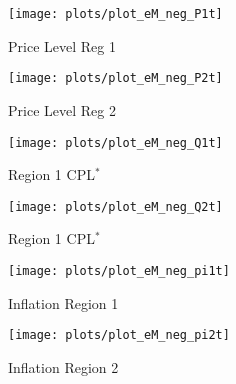 \documentclass[../thesis.tex]{subfiles}
\begin{document}
\begin{figure}[h!]
	\begin{subfigure}[b]{0.27\textwidth}
		\centering
		\texttt{[image: plots/plot\_eM\_neg\_P1t]}
		\caption{\scriptsize Price Level Reg 1}
		\label{fig:eM-neg-P1t}
	\end{subfigure}
	\hspace*{0.5cm}
	\begin{subfigure}[b]{0.27\textwidth}
		\centering
		\texttt{[image: plots/plot\_eM\_neg\_P2t]}
		\caption{\scriptsize Price Level Reg 2}
		\label{fig:eM-neg-P2t}
	\end{subfigure}
	\hspace*{0.5cm}
	\begin{subfigure}[b]{0.27\textwidth}
		\centering
		\texttt{[image: plots/plot\_eM\_neg\_Q1t]}
		\caption{\scriptsize Region 1 CPL$^{\ast}$}
		\label{fig:eM-neg-Q1t}
	\end{subfigure}
	\vspace*{0.1cm}
	\begin{subfigure}[b]{0.27\textwidth}
		\centering
		\texttt{[image: plots/plot\_eM\_neg\_Q2t]}
		\caption{\scriptsize Region 1 CPL$^{\ast}$}
		\label{fig:eM-neg-Q2t}
	\end{subfigure}
	\hspace*{0.5cm}
	\begin{subfigure}[b]{0.27\textwidth}
		\centering
		\texttt{[image: plots/plot\_eM\_neg\_pi1t]}
		\caption{\scriptsize Inflation Region 1}
		\label{fig:eM-neg-pi1t}
	\end{subfigure}
	\hspace*{0.5cm}
	\begin{subfigure}[b]{0.27\textwidth}
		\centering
		\texttt{[image: plots/plot\_eM\_neg\_pi2t]}
		\caption{\scriptsize Inflation Region 2}
		\label{fig:eM-neg-pi2t}
	\end{subfigure}
	\vspace*{0.1cm}
	\begin{subfigure}[b]{0.27\textwidth}

\end{subfigure}
\end{figure}
\end{document}
